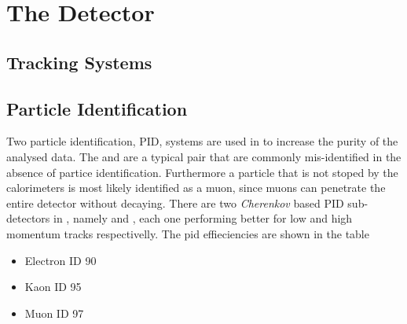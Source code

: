 
\chapter{The \lhcb Detector}
\label{lhcb_detector}


\section{Tracking Systems}
\label{det_tracking}


\section{Particle Identification}
\label{det_pid}
Two particle identification, PID, systems are used in \lhcb to increase the purity of the analysed data.
The \kaon and \pion are a typical pair that are commonly mis-identified in the absence of partice
identification. Furthermore a particle that is not stoped by the calorimeters is most likely identified
as a muon, since muons can penetrate the entire \lhcb detector without decaying. There are two
{\it Cherenkov} based PID sub-detectors in \lhcb, namely \richone and \richtwo, each one performing
better for low and high momentum tracks respectivelly. The pid effieciencies are shown in the table \tabref{}

\begin{itemize}
  \item Electron ID  90 %
  \item Kaon ID 95 %
  \item Muon ID 97 %
\end{itemize}

